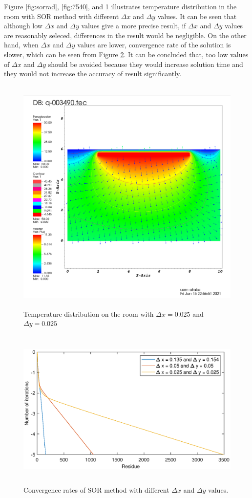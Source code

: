 \documentclass[letterpaper,12pt]{article}
\begin{document}
Figure \ref{fig:sorrad}, \ref{fig:7540}, and \ref{fig:402242} illustrates temperature
distribution in the room with SOR method with different $\Delta x$ and $\Delta y$ values. 
It can be seen that although low $\Delta x$ and $\Delta y$ values give a more precise result, 
if $\Delta x$ and $\Delta y$ values are reasonably seleced, differences in the result would 
be negligible. On the other hand, when $\Delta x$ and $\Delta y$ values are lower, convergence rate 
of the solution is slower, which can be seen from Figure \ref{fig:converratedelta}. It can be concluded that, 
too low values of $\Delta x$ and $\Delta y$ should be avoided because they would increase solution time and they 
would not increase the accuracy of result significantly.

\begin{figure}[H] 
	\centering 
	\includegraphics[max height=12cm]{graphs/imax402jmax242_default/imax402jmax242_default.png}
	\caption{Temperature distribution on the room with $\Delta x=0.025$ and $\Delta y = 0.025$}
 	\label{fig:402242}
\end{figure}
\begin{figure}[H] 
	\centering 
	\includegraphics[max height=8cm]{graphs/residual_deltax.eps}
	\caption{Convergence rates of SOR method with different $\Delta x$ and $\Delta y$ values.}
 	\label{fig:converratedelta}
\end{figure}
\end{document}
